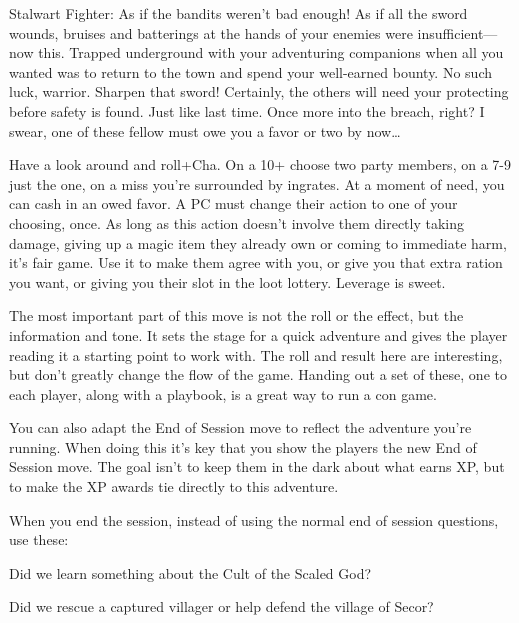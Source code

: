        
\startExample
Stalwart Fighter: As if the bandits weren’t bad enough! As if all the sword wounds, bruises and batterings at the hands of your enemies were insufficient—now this. Trapped underground with your adventuring companions when all you wanted was to return to the town and spend your well-earned bounty. No such luck, warrior. Sharpen that sword! Certainly, the others will need your protecting before safety is found. Just like last time. Once more into the breach, right? I swear, one of these fellow must owe you a favor or two by now…
\stopExample
       
\startExample
Have a look around and roll+Cha. On a 10+ choose two party members, on a 7-9 just the one, on a miss you’re surrounded by ingrates. At a moment of need, you can cash in an owed favor. A PC must change their action to one of your choosing, once. As long as this action doesn’t involve them directly taking damage, giving up a magic item they already own or coming to immediate harm, it’s fair game. Use it to make them agree with you, or give you that extra ration you want, or giving you their slot in the loot lottery. Leverage is sweet.
\stopExample
       

The most important part of this move is not the roll or the effect, but the information and tone. It sets the stage for a quick adventure and gives the player reading it a starting point to work with. The roll and result here are interesting, but don't greatly change the flow of the game. Handing out a set of these, one to each player, along with a playbook, is a great way to run a con game.

       

You can also adapt the End of Session move to reflect the adventure you're running. When doing this it's key that you show the players the new End of Session move. The goal isn't to keep them in the dark about what earns XP, but to make the XP awards tie directly to this adventure.

       
\startExample
When you end the session, instead of using the normal end of session questions, use these:
\stopExample
       
\startitemize[1,packed]
         
\item Did we learn something about the Cult of the Scaled God?

         
\item Did we rescue a captured villager or help defend the village of Secor?

